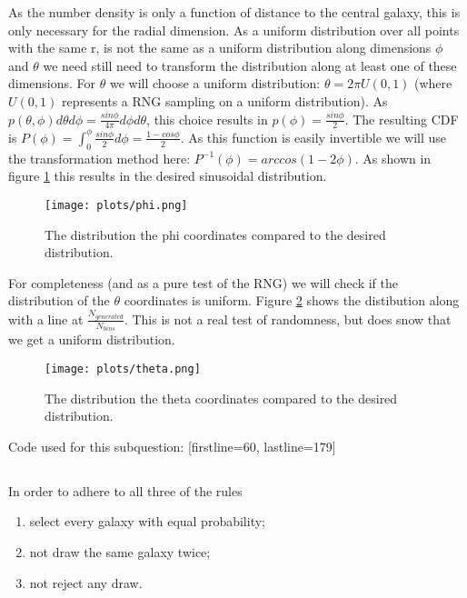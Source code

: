 As the number density is only a function of distance to the central galaxy, this is only necessary for the radial dimension.
As a uniform distribution over all points with the same r, is not the same as a uniform distribution along dimensions $\phi$ and $\theta$ we need still need to transform
the distribution along at least one of these dimensions.
For $\theta$ we will choose a uniform distribution: $\theta = 2 \pi U(0,1)$ (where $U(0,1)$ represents a RNG sampling on a uniform distribution).
As $p(\theta,\phi)d\theta d\phi = \frac{sin \phi}{4 \pi} d\phi d\theta$,
this choice results in $p(\phi) = \frac{sin \phi}{2}$.
The resulting CDF is $P(\phi) = \int_0^{\phi} \frac{sin \phi}{2} d\phi = \frac{1-cos \phi}{2}$.
As this function is easily invertible we will use the transformation method here:
$P^{-1}(\phi) = arccos(1-2\phi)$.
As shown in figure \ref{fig:phi} this results in the desired sinusoidal distribution.
\begin{figure}[H]
    \centering
    \texttt{[image: plots/phi.png]}
    \caption{The distribution the phi coordinates compared to the desired distribution.}
    \label{fig:phi}
\end{figure}

For completeness (and as a pure test of the RNG) we will check if the distribution of the $\theta$ coordinates is uniform.
Figure \ref{fig:theta} shows the distibution along with a line at $\frac{N_{generated}}{N_{bins}}$.
This is not a real test of randomness, but does snow that we get a uniform distribution.
\begin{figure}[H]
    \centering
    \texttt{[image: plots/theta.png]}
    \caption{The distribution the theta coordinates compared to the desired distribution.}
    \label{fig:theta}
\end{figure}

Code used for this subquestion:
[firstline=60, lastline=179]

\subsection{}
In order to adhere to all three of the rules

\begin{enumerate}
    \item select every galaxy with equal probability;
    \item not draw the same galaxy twice;
    \item not reject any draw.
\end{enumerate}

